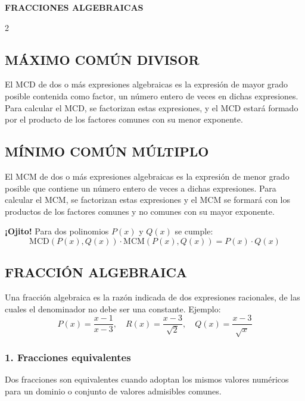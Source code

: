 \documentclass[10pt]{article}
\begin{document}
	\begin{center}
		\Large\bfseries FRACCIONES ALGEBRAICAS
	\end{center}

\begin{multicols}{2}

	\subsection*{MÁXIMO COMÚN DIVISOR}
	El MCD de dos o más expresiones algebraicas es la expresión de mayor grado posible contenida como factor, un número entero de veces en dichas expresiones. Para calcular el MCD, se factorizan estas expresiones, y el MCD estará formado por el producto de los factores comunes con su menor exponente.

	\subsection*{MÍNIMO COMÚN MÚLTIPLO}
	El MCM de dos o más expresiones algebraicas es la expresión de menor grado posible que contiene un número entero de veces a dichas expresiones. Para calcular el MCM, se factorizan estas expresiones y el MCM se formará con los productos de los factores comunes y no comunes con su mayor exponente.

	\textbf{¡Ojito!}
	Para dos polinomios $P(x)$ y $Q(x)$ se cumple:
	\[
	\text{MCD}(P(x), Q(x)) \cdot \text{MCM}(P(x), Q(x)) = P(x) \cdot Q(x)
	\]

	\subsection*{FRACCIÓN ALGEBRAICA}
	Una fracción algebraica es la razón indicada de dos expresiones racionales, de las cuales el denominador no debe ser una constante. Ejemplo:
	\[
	P(x) = \frac{x - 1}{x - 3}, \quad R(x) = \frac{x - 3}{\sqrt{2}}, \quad Q(x) = \frac{x - 3}{\sqrt{x}}
	\]

	\subsubsection*{1. Fracciones equivalentes}
	Dos fracciones son equivalentes cuando adoptan los mismos valores numéricos para un dominio o conjunto de valores admisibles comunes.


\end{multicols}
\end{document}
